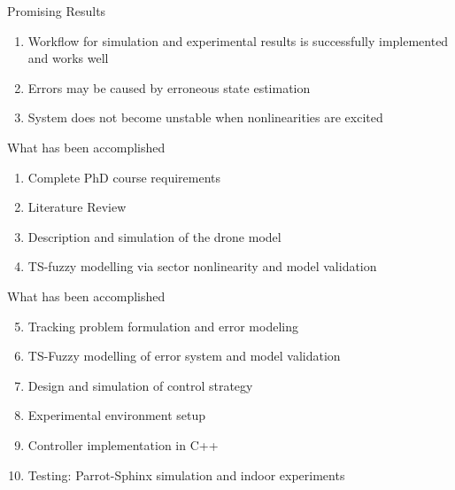 \begin{frame}{Promising Results}
	\begin{enumerate}
		\item Workflow for simulation and experimental results is successfully implemented and works well 
		\item Errors may be caused by erroneous state estimation
		\item System does not become unstable when nonlinearities are excited
	\end{enumerate}
\end{frame}


\begin{frame}{What has been accomplished}
	\begin{enumerate}
		\item Complete PhD course requirements
		\item Literature Review
		\item Description and simulation of the drone model\autocite{VagoSantana2014a}
		\item TS-fuzzy modelling via sector nonlinearity and model validation
	\end{enumerate}
\end{frame}

\begin{frame}{What has been accomplished}
	\begin{enumerate}
		\setcounter{enumi}{4}
		\item Tracking problem formulation and error modeling
		\item TS-Fuzzy modelling of error system and model validation
		\item Design and simulation of control strategy
		\item Experimental environment setup
		\item Controller implementation in C++
		\item Testing: Parrot-Sphinx simulation and indoor experiments
	\end{enumerate}
\end{frame}


